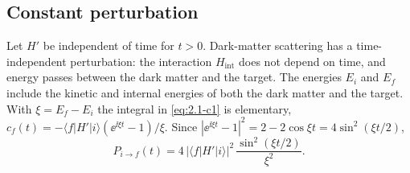 \subsection{Constant perturbation}

Let $H'$ be independent of time for $t > 0$. Dark-matter scattering has a time-independent perturbation: the interaction $H_{\mathrm{int}}$ does not depend on time, and energy passes between the dark matter and the target. The energies $E_i$ and $E_f$ include the kinetic and internal energies of both the dark matter and the target. With $\xi = E_f - E_i$ the integral in \cref{eq:2.1-c1} is elementary, $c_f(t) = -\langle f|H'|i\rangle(\ee^{\ii\xi t} - 1)/\xi$. Since $|\ee^{\ii\xi t} - 1|^2 = 2 - 2\cos\xi t = 4\sin^2(\xi t/2)$,
\begin{equation}
  P_{i\to f}(t) = 4\,|\langle f|H'|i\rangle|^2\,\frac{\sin^2(\xi t/2)}{\xi^2} .
  \label{eq:2.1-Pstatic}
\end{equation}

